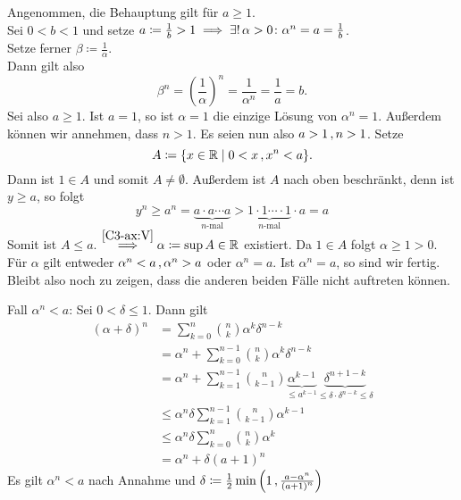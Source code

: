 \documentclass[../ana1.tex]{subfiles}
\begin{document}
\begin{bew}
	Angenommen, die Behauptung gilt für \(a \geq 1 \). \\
	Sei \(0 < b < 1\) und setze \(a \coloneqq \frac{1}{b} > 1 \implies \exists! \, \alpha > 0 \colon \alpha^n = a = \frac{1}{b} \). \\
	Setze ferner \(\beta \coloneqq \frac{1}{\alpha}\). \\
	Dann gilt also
	\[ \beta^n = {\left(\frac{1}{\alpha}\right)}^n = \frac{1}{\alpha^n} = \frac{1}{a} = b.\]
	Sei also \(a \geq 1 \). Ist \(a = 1 \), so ist \(\alpha = 1 \) die einzige Lösung von \(\alpha^n = 1 \). Außerdem können wir annehmen, dass \(n > 1 \).
	Es seien nun also \(a > 1 \operatorname{,} n > 1 \). Setze
	\[ A \coloneqq \{ x \in \mathbb{R} \; \vert \; 0 < x \operatorname{,} x^n< a \}. \]
	Dann ist \(1 \in A \) und somit \(A \neq \emptyset \). Außerdem ist \(A \) nach oben beschränkt, denn ist \(y \geq a\), so folgt
	\[ y^n \geq a^n = \underbrace{a \cdot a \cdots a}_{n\text{-mal}} > \underbrace{1 \cdot 1 \cdots \cdot 1}_{n\text{-mal}} \cdot a = a \]
	Somit ist \(A \leq a \). \(\overset{\autoref{C3-ax:V}}{\implies} \alpha \coloneqq \sup A \in \R \) existiert. Da \(1 \in A \) folgt \(\alpha \geq 1 > 0 \). \\
	Für \(\alpha \) gilt entweder \(\alpha^n <a \operatorname{,} \alpha^n > a \) oder \(\alpha^n = a \). Ist \(\alpha^n = a \), so sind wir fertig. Bleibt also noch zu zeigen,
	dass die anderen beiden Fälle nicht auftreten können.
	\begin{faelle}
		\item[Fall \(\alpha^n < a\):] Sei \(0 < \delta \leq 1 \). Dann gilt
			\!\begin{align}
				{(\alpha + \delta)}^n & = \sum_{k=0}^{n} \binom{n}{k} \alpha^k\delta^{n-k} \nonumber \\
								  	  & = \alpha^n + \sum_{k=0}^{n-1} \binom{n}{k} \alpha^k\delta^{n-k} \nonumber \\
									  & = \alpha^n + \sum_{k=1}^{n-1} \binom{n}{k-1} \underbrace{\alpha^{k-1}}_{\leq a^{k-1}}\underbrace{\delta^{n+1-k}}_{\leq \delta \cdot \delta^{n-k} \leq \delta} \nonumber \\
									  & \leq \alpha^n \delta \sum_{k=1}^{n-1} \binom{n}{k-1} \alpha^{k-1} \nonumber \\
									  & \leq \alpha^n \delta \sum_{k=0}^{n} \binom{n}{k} \alpha^{k} \nonumber \\
									  & = \alpha^n + \delta {(a+1)}^n \tag{*}
			\end{align}
			Es gilt \(\alpha^n < a\) nach Annahme und \(\delta \coloneqq \frac{1}{2} \min{\left(1 \operatorname{,}\frac{a-\alpha^n}{{(a+1)}^n}\right)} \) \\

\end{faelle}
\end{bew}
\end{document}
